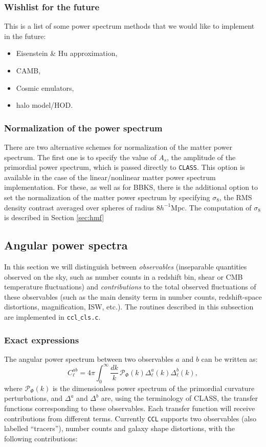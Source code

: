\documentclass[\docopts]{\docclass}
\begin{document}
\subsubsection{Wishlist for the future}
\label{Pk_whishlist}
This is a list of some power spectrum methods that we would like to implement in the future:
\begin{itemize}
 \item Eisenstein \& Hu approximation,
 \item CAMB,
 \item Cosmic emulators,
 \item halo model/HOD.
\end{itemize}


\subsubsection{Normalization of the power spectrum}
\label{sec:PSnorm}

There are two alternative schemes for normalization of the matter power spectrum. The first one is to specify the value of $A_s$, the amplitude of the primordial power spectrum, which is passed directly to {\tt CLASS}. This option is available in the case of the linear/nonlinear matter power spectrum implementation. For these, as well as for BBKS, there is the additional option to set the normalization of the matter power spectrum by specifying $\sigma_8$, the RMS density contrast averaged over spheres of radius $8h^{-1}$Mpc. The computation of $\sigma_8$ is described in Section \ref{sec:hmf}

\subsection{Angular power spectra}
\label{sec:cl}

In this section we will distinguish between {\sl observables} (inseparable quantities observed on the sky, such as number counts in a redshift bin, shear or CMB temperature fluctuations) and {\sl contributions} to the total observed fluctuations of these observables (such as the main density term in number counts, redshift-space distortions, magnification, ISW, etc.).
The routines described in this subsection are implemented in {\tt ccl$\_$cls.c}.

\subsubsection{Exact expressions}
The angular power spectrum between two observables $a$ and $b$ can be written as:
\begin{equation}
 C^{ab}_\ell=4\pi\int_0^\infty \frac{dk}{k}\,\mathcal{P}_\Phi(k)\Delta^a_\ell(k)\Delta^b_\ell(k),
\end{equation}
where $\mathcal{P}_\Phi(k)$ is the dimensionless power spectrum of the primordial curvature perturbations, and $\Delta^a$ and $\Delta^b$ are, using the terminology of CLASS, the transfer functions corresponding to these observables. Each transfer function will receive contributions from different terms. Currently {\tt CCL} supports two observables (also labelled ``tracers''), number counts and galaxy shape distortions, with the following contributions:
\end{document}
